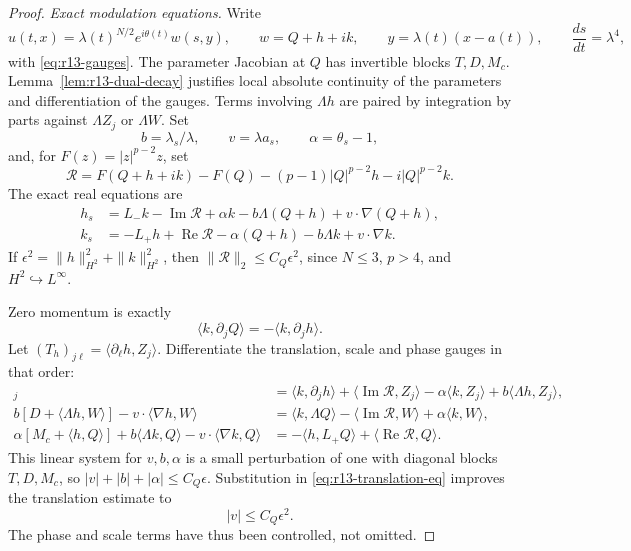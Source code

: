 \begin{proof}
\emph{Exact modulation equations.}
Write
\[
 u(t,x)=\lambda(t)^{N/2}e^{i\theta(t)}w(s,y),\qquad
 w=Q+h+ik,\qquad y=\lambda(t)(x-a(t)),\qquad
 \frac{ds}{dt}=\lambda^4,
\]
with \eqref{eq:r13-gauges}. The parameter Jacobian at $Q$ has
invertible blocks $T,D,M_c$. Lemma~\ref{lem:r13-dual-decay} justifies
local absolute continuity of the parameters and
differentiation of the gauges. Terms involving $\Lambda h$ are paired
by integration by parts against $\Lambda Z_j$ or $\Lambda W$.
Set
\[
 b=\lambda_s/\lambda,\qquad v=\lambda a_s,\qquad
 \alpha=\theta_s-1,
\]
and, for $F(z)=|z|^{p-2}z$, set
\[
 \mathcal R=F(Q+h+ik)-F(Q)
 -(p-1)|Q|^{p-2}h-i|Q|^{p-2}k.
\]
The exact real equations are
\begin{align}
 h_s&=L_-k-\operatorname{Im}\mathcal R+\alpha k
       -b\Lambda(Q+h)+v\cdot\nabla(Q+h),\label{eq:r13-real-flow}\\
 k_s&=-L_+h+\operatorname{Re}\mathcal R-\alpha(Q+h)
       -b\Lambda k+v\cdot\nabla k.\label{eq:r13-imag-flow}
\end{align}
If $\epsilon^2=\|h\|_{H^2}^2+\|k\|_{H^2}^2$, then
$\|\mathcal R\|_2\le C_Q\epsilon^2$, since $N\le3$, $p>4$, and
$H^2\hookrightarrow L^\infty$.

Zero momentum is exactly
\begin{equation}\label{eq:r13-momentum-cancel}
 \langle k,\partial_jQ\rangle=-\langle k,\partial_jh\rangle.
\end{equation}
Let $(T_h)_{j\ell}=\langle\partial_\ell h,Z_j\rangle$.
Differentiate the translation, scale and phase gauges in that order:
\begin{align}
 [(T+T_h)v]_j
 &=\langle k,\partial_jh\rangle
   +\langle\operatorname{Im}\mathcal R,Z_j\rangle
   -\alpha\langle k,Z_j\rangle
   +b\langle\Lambda h,Z_j\rangle,
   \label{eq:r13-translation-eq}\\
 b[D+\langle\Lambda h,W\rangle]-v\cdot\langle\nabla h,W\rangle
 &=\langle k,\Lambda Q\rangle
   -\langle\operatorname{Im}\mathcal R,W\rangle
   +\alpha\langle k,W\rangle,
   \label{eq:r13-scale-eq}\\
 \alpha[M_c+\langle h,Q\rangle]+b\langle\Lambda k,Q\rangle
   -v\cdot\langle\nabla k,Q\rangle
 &=-\langle h,L_+Q\rangle
   +\langle\operatorname{Re}\mathcal R,Q\rangle.
   \label{eq:r13-phase-eq}
\end{align}
This linear system for $v,b,\alpha$ is a small perturbation of one
with diagonal blocks $T,D,M_c$, so
$|v|+|b|+|\alpha|\le C_Q\epsilon$. Substitution in
\eqref{eq:r13-translation-eq} improves the translation estimate to
\begin{equation}\label{eq:r13-quadratic-v}
 |v|\le C_Q\epsilon^2.
\end{equation}
The phase and scale terms have thus been controlled, not omitted.


\end{proof}
